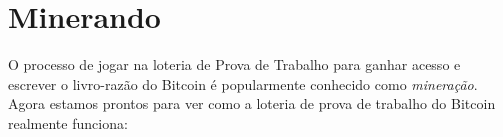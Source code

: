 



\chapter{Minerando}
\label{ch:capitulo5}

O processo de jogar na loteria de Prova de Trabalho para ganhar acesso e escrever o livro-razão do Bitcoin é popularmente conhecido como \textit{mineração}.
Agora estamos prontos para ver como a loteria de prova de trabalho do Bitcoin realmente funciona:

